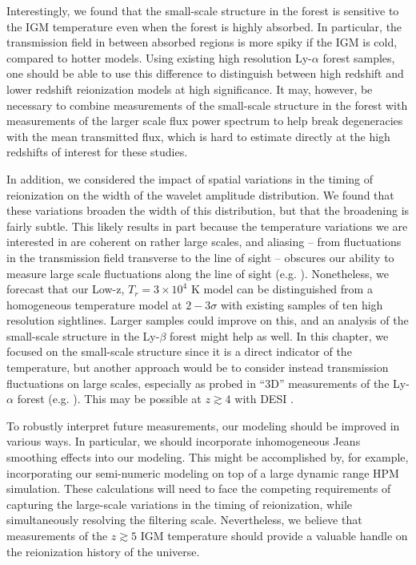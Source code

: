 Interestingly, we found that the small-scale structure in the
forest is sensitive to the IGM temperature even when the forest is highly absorbed. In particular, the transmission
field in between absorbed regions is more spiky if the IGM is cold, compared to hotter models. Using existing
high resolution Ly-$\alpha$ forest samples, one should be able to use this difference to 
distinguish between high redshift and lower
redshift reionization models at high significance. It may, however, be necessary to combine measurements
of the small-scale structure in the forest with measurements of the larger scale flux power spectrum to help
break degeneracies with the mean transmitted flux, which is hard to estimate directly at the high redshifts of
interest for these studies. 

In addition, we considered the impact of spatial variations in the timing of reionization on the width of
the wavelet amplitude distribution. We found that these variations broaden the width of this distribution, but
that the broadening is fairly subtle. This likely results in part because the temperature variations we
are interested in are coherent on rather large scales, and aliasing -- from fluctuations in the transmission
field transverse to the line of sight -- obscures our ability to measure large scale fluctuations along
the line of sight (e.g. \citealt{McQuinn:2010mq,Lai:2005ha}). Nonetheless, we forecast that our Low-z, $T_r=3 \times 10^4$
K model can be distinguished from a homogeneous temperature model at $2-3 \sigma$ with existing samples of ten high
resolution sightlines. Larger samples could improve on this, and an analysis of the small-scale structure in the
Ly-$\beta$ forest might help as well. In this chapter, we focused on the small-scale structure since it is a direct
indicator of the temperature, but another approach would be to consider instead transmission fluctuations on
large scales, especially as probed in ``3D'' measurements of the Ly-$\alpha$ forest (e.g. \citealt{McQuinn:2010mq}). This
may be possible at $z \gtrsim 4$ with DESI \citep{Levi:2013gra,McQuinn:2010mq}.

To robustly interpret future measurements, our modeling should be improved in various ways. In particular, we should incorporate
inhomogeneous Jeans smoothing effects into our modeling. This might be accomplished by, for example, 
incorporating our semi-numeric
modeling on top of a large dynamic range HPM \citep{Gnedin:1997td} simulation. These 
calculations will need to face
the competing requirements of capturing the large-scale variations in the timing of reionization, while simultaneously
resolving the filtering scale. Nevertheless, we believe that measurements of the $z \gtrsim 5$ IGM temperature should
provide a valuable handle on the reionization history of the universe.



